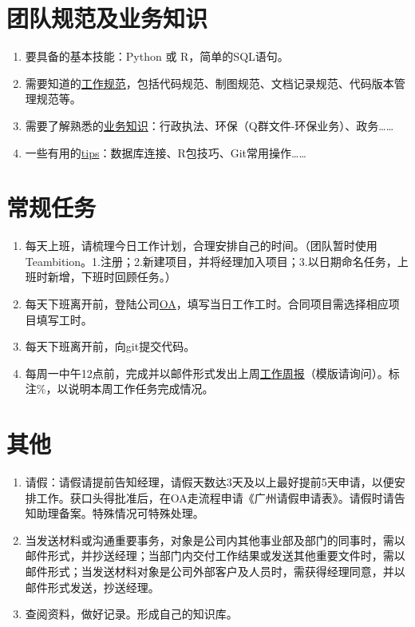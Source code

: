 \documentclass[]{book}
\begin{document}
\hypertarget{section-1}{%
\chapter{团队规范及业务知识}\label{section-1}}

\begin{enumerate}
\def\labelenumi{\arabic{enumi}.}
\item
  要具备的基本技能：Python 或 R，简单的SQL语句。
\item
  需要知道的\href{http://git.minstone.com.cn/dataanalysisteam/minstone_data_analyze_team/work_standard}{工作规范}，包括代码规范、制图规范、文档记录规范、代码版本管理规范等。
\item
  需要了解熟悉的\href{}{业务知识}：行政执法、环保（Q群文件-环保业务）、政务\ldots{}\ldots{}
\item
  一些有用的\href{http://git.minstone.com.cn/dataanalysisteam/minstone_data_analyze_team/QuickStart}{tips}：数据库连接、R包技巧、Git常用操作\ldots{}\ldots{}
\end{enumerate}

\hypertarget{section-2}{%
\chapter{常规任务}\label{section-2}}

\begin{enumerate}
\def\labelenumi{\arabic{enumi}.}
\item
  每天上班，请梳理今日工作计划，合理安排自己的时间。（团队暂时使用Teambition。1.注册；2.新建项目，并将经理加入项目；3.以日期命名任务，上班时新增，下班时回顾任务。）
\item
  每天下班离开前，登陆公司\href{http://192.168.0.212/instance-web/minstone/login}{OA}，填写当日工作工时。合同项目需选择相应项目填写工时。
\item
  每天下班离开前，向git提交代码。
\item
  每周一中午12点前，完成并以邮件形式发出上周\href{http://git.minstone.com.cn/dataanalysisteam/minstone_data_analyze_team/work_standard/blob/master/WeeklyGuide_V1.0.md}{工作周报}（模版请询问）。标注\%，以说明本周工作任务完成情况。
\end{enumerate}

\hypertarget{section-3}{%
\chapter{其他}\label{section-3}}

\begin{enumerate}
\def\labelenumi{\arabic{enumi}.}
\item
  请假：请假请提前告知经理，请假天数达3天及以上最好提前5天申请，以便安排工作。获口头得批准后，在OA走流程申请《广州请假申请表》。请假时请告知助理备案。特殊情况可特殊处理。
\item
  当发送材料或沟通重要事务，对象是公司内其他事业部及部门的同事时，需以邮件形式，并抄送经理；当部门内交付工作结果或发送其他重要文件时，需以邮件形式；当发送材料对象是公司外部客户及人员时，需获得经理同意，并以邮件形式发送，抄送经理。
\item
  查阅资料，做好记录。形成自己的知识库。
\end{enumerate}


\end{document}
